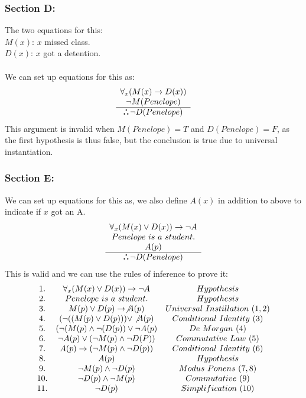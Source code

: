 \documentclass[titlepage]{article}\pagestyle{empty}
\def\therefore{\boldsymbol{\text{ }
\leavevmode
\lower0.4ex\hbox{$\cdot$}
\kern-.5em\raise0.7ex\hbox{$\cdot$}
\kern-0.55em\lower0.4ex\hbox{$\cdot$}
\thinspace\text{ }}}
\begin{document}
\subsubsection*{Section D:}
The two equations for this:\\
$M(x)$: $x$ missed class.\\
$D(x)$: $x$ got a detention.\\~\\
We can set up equations for this as:
\begin{displaymath}
\begin{array}{c}
\forall_x (M(x) \to D(x))\\
\neg M(Penelope)\\
\hline
\therefore \neg D(Penelope)
\end{array}
\end{displaymath}
This argument is invalid when $M(Penelope) = T$ and $D(Penelope) = F$, as the first hypothesis is thus false, but the conclusion is true due to universal instantiation.
\subsubsection*{Section E:}
We can set up equations for this as, we also define $A(x)$ in addition to above to indicate if $x$ got an A.
\begin{displaymath}
\begin{array}{c}
\forall_x (M(x) \lor D(x)) \to \neg A\\
Penelope\ is\ a\ student.\\
A(p)\\
\hline
\therefore \neg D(Penelope)
\end{array}
\end{displaymath}
This is valid and we can use the rules of inference to prove it:
\begin{displaymath}
\begin{array}{c c c}
1. & \forall_x (M(x) \lor D(x)) \to \neg A & Hypothesis\\
2. & Penelope\ is\ a\ student. & Hypothesis\\ 
3. & M(p) \lor D(p) \to \not A(p) & Universal\ Instillation\ (1,2)\\
4. & (\neg((M(p) \lor D(p))) \lor \not A(p) & Conditional\ Identity\ (3)\\
5. & (\neg(M(p) \land \neg(D(p)) \lor \neg A(p) & De\ Morgan\ (4)\\
6. & \neg A(p) \lor (\neg M(p) \land \neg D(P)) & Commutative\ Law\ (5)\\
7. & A(p) \to (\neg M(p) \land \neg D(p)) & Conditional\ Identity\ (6)\\
8. & A(p) & Hypothesis\\
9. & \neg M(p) \land \neg D(p) & Modus\ Ponens\ (7, 8)\\ 
10. & \neg D(p) \land \neg M(p) & Commutative\ (9)\\ 
11. & \neg D(p) & Simplification\ (10)
\end{array}
\end{displaymath}
\end{document}
